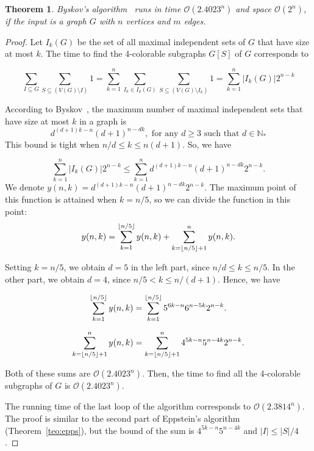 \documentclass[fleqn,10pt]{SelfArx} %
\DeclarePairedDelimiter\floor{\lfloor}{\rfloor}
\newtheorem{teor}{Theorem}
\newcommand{\cO}{\mathcal{O}}
\begin{document}
	\begin{teor}\label{teo:bys}
		Byskov's algorithm~\cite{Byskov03} runs in time $\cO(2.4023^n)$ and
		space $\cO(2^n)$, if the input is a graph $G$ with $n$ vertices and $m$ edges.
		
	\end{teor}
	\begin{proof} 
		Let $I_k(G)$ be the set of all maximal independent sets
		of $G$ that have size at most $k$. The time to find the 4-colorable
		subgraphs $G[S]$ of $G$ corresponds to
		
		\begin{equation*}
		\sum_{I \subseteq G} \sum_{S \subseteq (V(G) \setminus I)} 1 
		= 
		\sum_{k=1}^n \sum_{I_k \in I_k(G)} \sum_{S \subseteq (V(G) \setminus I_k)} 1
		= 
		\sum_{k=1}^{n} |I_k(G)| 2^{n-k}
		\end{equation*}
		
		According to Byskov~\cite{Byskov04}, the maximum number of maximal independent sets that have size
		at most $k$ in a graph is 
		\begin{equation*}
		d^{(d+1)k-n}{(d+1)}^{n-dk}, 
		\text{ for any } d \geq 3 \text{ such that } d \in \mathbb{N}_*
		\end{equation*}
		This bound is tight when $n/d \leq k \leq n(d+1)$. So, we have
		
		\begin{equation*}
		\sum_{k=1}^{n} |I_k(G)| 2^{n-k} \leq \sum_{k=1}^{n} d^{(d+1)k-n}{(d+1)}^{n-dk} 2^{n-k}.
		\end{equation*}
		We denote $y(n,k) = d^{(d+1)k-n}{(d+1)}^{n-dk} 2^{n-k}$.  The
		maximum point of this function is attained when $k = n/5$, so we can
		divide the function in this point:
		\begin{equation*}
		y(n,k) = \sum_{k=1}^{\floor{n/5}} y(n,k) + \sum_{k=\floor{n/5}+1}^n y(n,k).
		\end{equation*}
		
		Setting $k = n/5$, we obtain $d = 5$ in the left part, since
		$n/d \leq k \leq n/5$. In the other part, we obtain $d = 4$, since $n/5 <
		k \leq n/(d+1)$. Hence, we have
		
		\begin{equation*}
		\sum_{k=1}^{\floor{n/5}} y(n,k) = \sum_{k=1}^{\floor{n/5}} 5^{6k-n}6^{n-5k}2^{n-k}.
		\end{equation*}
		
		\begin{equation*}
		\sum_{k=\floor{n/5}+1}^n y(n,k) = \sum_{k=\floor{n/5}+1}^n 4^{5k-n}5^{n-4k}2^{n-k}.
		\end{equation*}
		
		Both of these sums are $\cO(2.4023^n)$. Then,
		the time to find all the 4-colorable subgraphs of $G$ is
		$\cO(2.4023^n)$.
		
		
		The running time of the last loop of the algorithm corresponds
		to $\cO(2.3814^n)$. The proof is similar to the second part of
		Eppstein's algorithm~\cite{Eppstein03} (Theorem~\ref{teo:epps}), but
		the bound of the sum is $4^{5k-n}5^{n-4k}$ and $|I| \leq |S|/4$.
	\end{proof}
	
\end{document}
